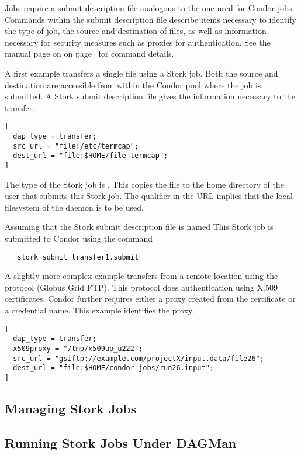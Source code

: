 Jobs require a submit description file analogous to the one used
for Condor jobs.
Commands within the submit description file
describe items necessary to identify the type of job,
the source and destination of files,
as well as information necessary for security measures
such as proxies for authentication.
See the  manual page on
on page~\pageref{man-stork-submit}
for command details.

A first example transfers a single file using a Stork job.
Both the source and destination are accessible from
within the Condor pool where the job is submitted.
A Stork submit description file gives the information
necessary to the transfer.

\footnotesize
\begin{verbatim}
[
  dap_type = transfer;
  src_url = "file:/etc/termcap";
  dest_url = "file:$HOME/file-termcap";
]
\end{verbatim}
\normalsize

The type of the Stork job is .
This copies the  file to the
home directory of the user that submits this Stork job.
The  qualifier in the URL implies
that the local filesystem of the 
daemon is to be used.

Assuming that the Stork submit description file
is named 
This Stork job is submitted to Condor using the command
\footnotesize
\begin{verbatim}
   stork_submit transfer1.submit
\end{verbatim}
\normalsize

A slightly more complex example transfers from a remote location
using the protocol  (Globus Grid FTP).
This protocol does authentication using X.509 certificates.
Condor further requires either a proxy created from the certificate
or a credential name.
This example identifies the proxy. 

\footnotesize
\begin{verbatim}
[
  dap_type = transfer;
  x509proxy = "/tmp/x509up_u222";
  src_url = "gsiftp://example.com/projectX/input.data/file26";
  dest_url = "file:$HOME/condor-jobs/run26.input";
]
\end{verbatim}
\normalsize


\subsection{\label{sec:Stork-Job-Management}Managing Stork Jobs}
\Todo

\subsection{\label{sec:Stork-Advanced}Running Stork Jobs Under DAGMan}
\Todo

